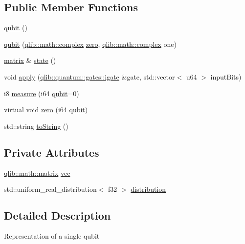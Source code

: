 \subsection*{Public Member Functions}
\begin{DoxyCompactItemize}
\item 
\hyperlink{classqlib_1_1quantum_1_1qubit_a32ca47a6fca663c267ddbbac49b12986}{qubit} ()
\item 
\hyperlink{classqlib_1_1quantum_1_1qubit_a9c84248c8855841087687baa8b0a08c3}{qubit} (\hyperlink{classqlib_1_1math_1_1complex}{qlib\+::math\+::complex} \hyperlink{classqlib_1_1quantum_1_1qubit_aa16b11ad849b672489c625196c800dd3}{zero}, \hyperlink{classqlib_1_1math_1_1complex}{qlib\+::math\+::complex} one)
\item 
\hyperlink{classqlib_1_1math_1_1matrix}{matrix} \& \hyperlink{classqlib_1_1quantum_1_1qubit_af8eaf337ffcb95c2445ddf35189335e4}{state} ()
\item 
void \hyperlink{classqlib_1_1quantum_1_1qubit_ab3b0b76d5c6f0e627a742fcafbc768ae}{apply} (\hyperlink{classqlib_1_1quantum_1_1gates_1_1igate}{qlib\+::quantum\+::gates\+::igate} \&gate, std\+::vector$<$ u64 $>$ input\+Bits)
\item 
i8 \hyperlink{classqlib_1_1quantum_1_1qubit_aaf001eff84ccb4b7a6992e42bc2143cb}{measure} (i64 \hyperlink{classqlib_1_1quantum_1_1qubit}{qubit}=0)
\item 
virtual void \hyperlink{classqlib_1_1quantum_1_1qubit_aa16b11ad849b672489c625196c800dd3}{zero} (i64 \hyperlink{classqlib_1_1quantum_1_1qubit}{qubit})
\item 
std\+::string \hyperlink{classqlib_1_1quantum_1_1qubit_a8bf29d1f66508e4878ea861c5d8e44ec}{to\+String} ()
\end{DoxyCompactItemize}
\subsection*{Private Attributes}
\begin{DoxyCompactItemize}
\item 
\hyperlink{classqlib_1_1math_1_1matrix}{qlib\+::math\+::matrix} \hyperlink{classqlib_1_1quantum_1_1qubit_a8f6e33dd5d0673f195360bc4b5c5442f}{vec}
\item 
std\+::uniform\+\_\+real\+\_\+distribution$<$ f32 $>$ \hyperlink{classqlib_1_1quantum_1_1qubit_abb97216eead736ab87e8756b9b4c2ce9}{distribution}
\end{DoxyCompactItemize}


\subsection{Detailed Description}
Representation of a single qubit 

